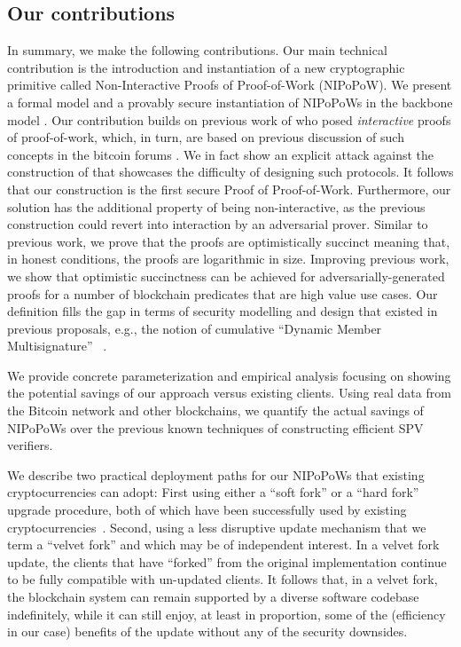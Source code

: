 \subsection{Our contributions}
In summary, we make the following contributions.
Our main technical contribution is the introduction and instantiation
of a new cryptographic
primitive called Non-Interactive Proofs of Proof-of-Work (NIPoPoW).
%
We present a formal model and a provably secure instantiation of NIPoPoWs in the
backbone model \cite{backbone}. Our contribution builds on previous work  of \cite{KLS} who posed {\em interactive} proofs of proof-of-work, which, in turn,
are based on previous discussion of such concepts in the bitcoin forums
\cite{highway}. We in fact show an explicit attack against the construction of \cite{KLS} that showcases the difficulty of designing such protocols. It follows
that our construction is the first secure Proof of Proof-of-Work.
Furthermore, our solution has the additional property of being non-interactive,
as the previous construction could revert into interaction by an adversarial
prover. Similar to previous work, we prove that the proofs are
optimistically succinct meaning that, in honest conditions, the proofs are
logarithmic in size. Improving previous work, we show that optimistic
succinctness can be achieved for adversarially-generated proofs for a number
of blockchain predicates that are high value use cases. Our definition
fills the gap in terms of security modelling and design that existed in previous
proposals, e.g., the notion of cumulative ``Dynamic Member Multisignature''
~\cite{sidechains}.

We provide concrete parameterization and empirical analysis focusing on showing
the potential savings of our approach versus existing clients. Using real data
from the Bitcoin network and other blockchains, we quantify the actual savings of
NIPoPoWs over the previous known techniques of constructing efficient SPV
verifiers.

We describe two practical deployment paths for our NIPoPoWs that existing
cryptocurrencies can adopt: First using either a ``soft fork'' or a ``hard
fork'' upgrade procedure, both of which have been successfully used by existing
cryptocurrencies~\cite{sok}. Second, using a less disruptive update mechanism
that we term a ``velvet fork'' and which may be of independent interest. In a
velvet fork update, the clients that have ``forked'' from the original
implementation continue to be fully compatible with un-updated clients. It
follows that, in a velvet fork, the blockchain system can remain supported by a
diverse software codebase indefinitely, while it can still enjoy, at least in
proportion, some of the (efficiency in our case) benefits of the update without
any of the security downsides.
